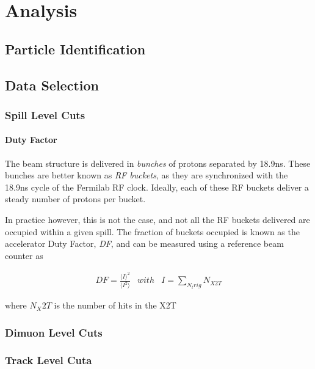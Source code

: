 \chapter{Analysis}


\section{Particle Identification}

\section{Data Selection}

\subsection{Spill Level Cuts}

\subsubsection{Duty Factor}

The beam structure is delivered in \emph{bunches} 
of protons separated by 18.9ns. These bunches are better
known as \emph{RF buckets}, as they are synchronized with the 18.9ns cycle of the Fermilab RF clock. Ideally, each of these RF buckets deliver a steady number of protons per bucket.

In practice however, this is not the case, and not all the RF buckets delivered are occupied within a given spill. The fraction of buckets occupied is known as the accelerator Duty Factor, \emph{DF}, and can be measured using a reference beam counter as

\begin{eqnarray} DF = \frac{\langle I \rangle ^2}{\langle I^2 \rangle} &
with &  I = \sum_{N_trig} N_{X2T}
\end{eqnarray}

where $N_X2T$ is the number of hits in the X2T 

\subsection{Dimuon Level Cuts}

\subsection{Track Level Cuta}

